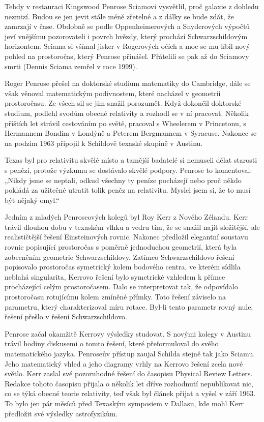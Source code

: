   Tehdy v restauraci Kingswood Penrose Sciamovi vysvětlil, proč galaxie z dohledu nezmizí. Budou se
  jen jevit stále méně zřetelné a z dálky se bude zdát, že zamrzají v čase. Obdobně se podle
  Oppenheimerových a Snyderových výpočtů jeví vnějšímu pozorovateli i povrch hvězdy, který prochází
  Schwarzschildovým horizontem. Sciama si všímal jisker v Rogerových očích a moc se mu líbil nový
  pohled na prostoročas, který Penrose přinášel. Přátelili se pak až do Sciamovy smrti (Dennis
  Sciama zemřel v roce 1999). 

  Roger Penrose přešel na doktorské studium matematiky do Cambridge, dále se však věnoval
  matematickým podivnostem, které nacházel v geometrii prostoročasu. Ze všech sil se jim snažil
  porozumět. Když dokončil doktorské studium, podlehl svodům obecné relativity a rozhodl se v ní
  pracovat. Několik příštích let strávil cestováním po světě, pracoval s Wheelerem v Princetonu, s
  Hermannem Bondim v Londýně a Peterem Bergmannem v Syracuse. Nakonec se na podzim 1963 připojil k
  Schildově texaské skupině v Austinu. 

  Texas byl pro relativitu skvělé místo a tamější badatelé si nemuseli dělat starosti s penězi,
  protože výzkumu se dostávalo skvělé podpory. Penrose to komentoval: „Nikdy jsme se neptali, odkud
  všechny ty peníze pocházejí nebo proč někdo pokládá za užitečné utratit tolik peněz na relativitu.
  Myslel jsem si, že to musí být nějaký omyl.“

  Jedním z mladých Penroseových kolegů byl Roy Kerr z Nového Zélandu. Kerr trávil dlouhou dobu v
  texaském vlhku a vedru tím, že se snažil najít složitější, ale realističtější řešení Einsteinových
  rovnic. Nakonec předložil elegantní soustavu rovnic popisující prostoročas s poměrně jednoduchou
  geometrií, která byla zobecněním geometrie Schwarzschildovy. Zatímco Schwarzschildovo řešení
  popisovalo prostoročas symetrický kolem bodového centra, ve kterém sídlila neblahá singularita,
  Kerrovo řešení bylo symetrické vzhledem k přímce procházející celým prostoročasem. Dalo se
  interpretovat tak, že odpovídalo prostoročasu rotujícímu kolem zmíněné přímky. Toto řešení
  záviselo na parametru, který charakterizoval míru rotace. Byl-li tento parametr rovný nule, řešení
  přešlo v řešení Schwarzschildovo. 

  Penrose začal okamžitě Kerrovy výsledky studovat. S novými kolegy v Austinu trávil hodiny
  diskusemi o tomto řešení, které přeformuloval do svého matematického jazyka. Penroseův přístup
  zaujal Schilda stejně tak jako Sciamu. Jeho matematický vhled a jeho diagramy vrhly na Kerrovo
  řešení zcela nové světlo. Kerr zaslal své pozoruhodné řešení do časopisu Physical Review Letters.
  Redakce tohoto časopisu přijala o několik let dříve rozhodnutí nepublikovat nic, co se týká obecné
  teorie relativity, teď však byl článek přijat a vyšel v září 1963. To bylo jen pár měsíců před
  Texaským symposiem v Dallasu, kde mohl Kerr předložit své výsledky astrofyzikům.

